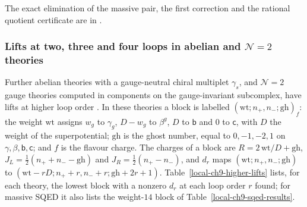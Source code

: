 \documentclass[11pt]{article}
\numberwithin{equation}{section}
\numberwithin{figure}{section}
\numberwithin{table}{section}
\begin{document}
The exact elimination of the massive pair, the first correction and the rational quotient certificate are in \cite[supplement, Section S8.1]{Repo}.

\subsubsection{Lifts at two, three and four loops in abelian and $\mathcal N=2$ theories}\label{sec-results-higher}

Further abelian theories with a gauge-neutral chiral multiplet $\gamma_s$, and $\mathcal N=2$ gauge theories computed in components on the gauge-invariant subcomplex, have lifts at higher loop order \cite[results report, \S8 and \S9]{Repo}. In these theories a block is labelled $(\mathrm{wt};n_+,n_-;\mathrm{gh})_f$: the weight $\mathrm{wt}$ assigns $w_g$ to $\gamma_g$, $D-w_g$ to $\beta^g$, $D$ to $\mathsf b$ and $0$ to $\mathsf c$, with $D$ the weight of the superpotential; $\mathrm{gh}$ is the ghost number, equal to $0,-1,-2,1$ on $\gamma,\beta,\mathsf b,\mathsf c$; and $f$ is the flavour charge. The charges of a block are $R=2\,\mathrm{wt}/D+\mathrm{gh}$, $J_L=\tfrac12(n_++n_--\mathrm{gh})$ and $J_R=\tfrac12(n_+-n_-)$, and $d_r$ maps $(\mathrm{wt};n_+,n_-;\mathrm{gh})$ to $(\mathrm{wt}-rD;n_++r,n_-+r;\mathrm{gh}+2r+1)$. Table~\ref{local-ch9-higher-lifts} lists, for each theory, the lowest block with a nonzero $d_r$ at each loop order $r$ found; for massive SQED it also lists the weight-$14$ block of Table~\ref{local-ch9-sqed-results}.
\end{document}
